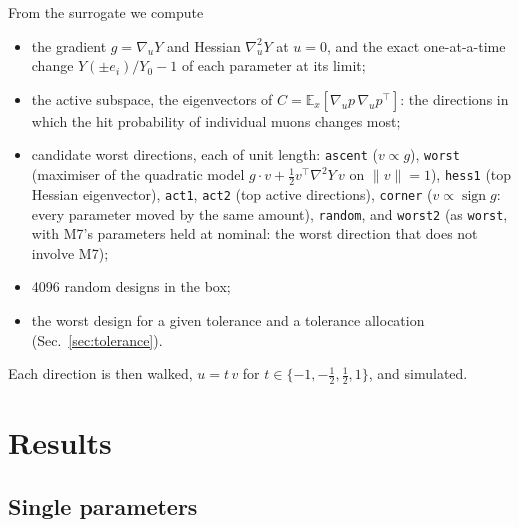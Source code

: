 \documentclass[11pt,a4paper]{article}
\begin{document}
From the surrogate we compute
\begin{itemize}
  \item the gradient $g=\nabla_u Y$ and Hessian $\nabla^2_u Y$ at $u=0$, and the exact
        one-at-a-time change $Y(\pm e_i)/Y_0-1$ of each parameter at its limit;
  \item the active subspace, the eigenvectors of $C=\mathbb{E}_x[\nabla_u p\,\nabla_u p^\top]$:
        the directions in which the hit probability of individual muons changes most;
  \item candidate worst directions, each of unit length:
    \texttt{ascent} ($v\propto g$),
    \texttt{worst} (maximiser of the quadratic model $g\cdot v+\tfrac12 v^\top\nabla^2Y\,v$ on
    $\|v\|=1$),
    \texttt{hess1} (top Hessian eigenvector), \texttt{act1}, \texttt{act2} (top active
    directions), \texttt{corner} ($v\propto\operatorname{sign} g$: every parameter moved by the
    same amount), \texttt{random}, and \texttt{worst2} (as \texttt{worst}, with M7's parameters
    held at nominal: the worst direction that does not involve M7);
  \item 4096 random designs in the box;
  \item the worst design for a given tolerance and a tolerance allocation
        (Sec.~\ref{sec:tolerance}).
\end{itemize}
Each direction is then walked, $u=t\,v$ for $t\in\{-1,-\tfrac12,\tfrac12,1\}$, and simulated.

\section{Results}

\subsection{Single parameters}
\label{sec:single}
\end{document}
